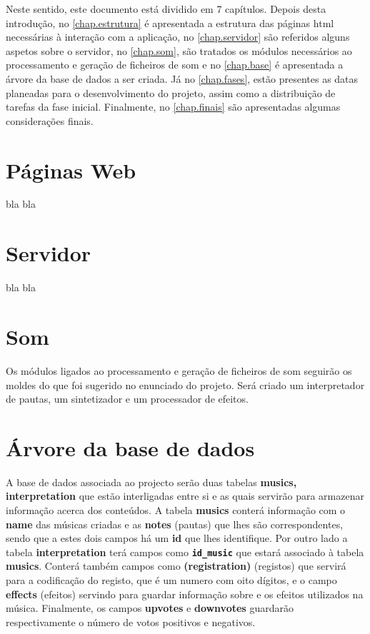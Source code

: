 \documentclass{report}
\begin{document}
Neste sentido, este documento está dividido em 7 capítulos. Depois desta introdução, no \autoref{chap.estrutura} é apresentada a estrutura das páginas \ac{html} necessárias à interação com a aplicação, no \autoref{chap.servidor} são referidos alguns aspetos sobre o servidor, no \autoref{chap.som}, são tratados os módulos necessários ao processamento e geração de ficheiros de som e no \autoref{chap.base} é apresentada a árvore da base de dados a ser criada. Já no \autoref{chap.fases}, estão presentes as datas planeadas para o desenvolvimento do projeto, assim como a distribuição de tarefas da fase inicial. Finalmente, no \autoref{chap.finais} são apresentadas algumas considerações finais.

\chapter{Páginas Web}
\label{chap.estrutura}

bla bla

\chapter{Servidor}
\label{chap.servidor}

bla bla

\chapter{Som}
\label{chap.som}

Os módulos ligados ao processamento e geração de ficheiros de som seguirão os moldes do que foi sugerido no enunciado do projeto. Será criado um interpretador de pautas, um sintetizador e um processador de efeitos.

\chapter{Árvore da base de dados}
\label{chap.base}

A base de dados associada ao projecto serão duas tabelas \textbf{musics, interpretation} que estão interligadas entre si e as quais servirão para armazenar informação acerca dos conteúdos.
A tabela \textbf{musics} conterá informação com o \textbf{name} das músicas criadas e as \textbf{notes} (pautas) que lhes são correspondentes, sendo que a estes dois campos há um \textbf{id} que lhes identifique.
Por outro lado a tabela \textbf{interpretation} terá campos como
\textbf{\texttt{id\_music}} que estará associado à tabela \textbf{musics}. Conterá também campos como \textbf{(registration)} (registos) que servirá para a codificação do registo, que é um numero com oito dígitos,  e o campo \textbf{effects} (efeitos) servindo para guardar informação sobre e os efeitos utilizados na música.
Finalmente, os campos \textbf{upvotes} e \textbf{downvotes} guardarão respectivamente o número de votos positivos e negativos. 
\end{document}
